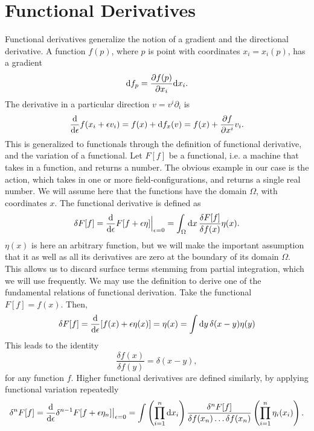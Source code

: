 \section{Functional Derivatives}
\label{section:Functional derivative}
Functional derivatives generalize the notion of a gradient and the directional derivative.
A function $f(p)$, where $p$ is point with coordinates $x_i = x_i(p)$, has a gradient
\begin{equation}
    \dd f_p = \pdv{f(p)}{x_i} \dd x_i.
\end{equation}
The derivative in a particular direction $v = v^i \partial_i$ is 
\begin{equation}
    \dv{\epsilon} f(x_i + \epsilon v_i) = f(x) + \dd f_x (v) = f(x) + \pdv{f}{x^i}v_i.
\end{equation}
This is generalized to functionals through the definition of functional derivative, and the variation of a functional.
Let $F[f]$ be a functional, i.e. a machine that takes in a function, and returns a number.
The obvious example in our case is the action, which takes in one or more field-configurations, and returns a single real number.
We will assume here that the functions have the domain $\Omega$, with coordinates $x$.
The functional derivative is defined as
\begin{equation}
    \delta F[f]
    =
    \dv{\epsilon} F[f + \epsilon \eta] \Big|_{\epsilon = 0}
    = \int_\Omega \dd x \, \frac{\delta F[f]}{\delta f(x)} \eta(x).
\end{equation}
$\eta(x)$ is here an arbitrary function, but we will make the important assumption that it as well as all its derivatives are zero at the boundary of its domain $\Omega$.
This allows us to discard surface terms stemming from partial integration, which we will use frequently.
We may use the definition to derive one of the fundamental relations of functional derivation.
Take the functional $F[f] = f(x)$. 
Then,
\begin{equation}
    \label{Functional derivative delta identity}
    \delta F[f] = \dv{\epsilon} [f(x) + \epsilon \eta(x)] = \eta(x) = \int \dd y \, \delta(x - y) \eta(y)
\end{equation}
This leads to the identity
\begin{equation}
    \frac{\delta f(x)}{\delta f(y)} = \delta(x - y),
\end{equation}
for any function $f$.
Higher functional derivatives are defined similarly, by applying functional variation repeatedly
\begin{equation}
    \delta^n F[f] = \dv{\epsilon} \delta^{n-1}F[f + \epsilon \eta_n] \big|_{\epsilon=0}
    = \int \left(\prod_{i=1}^n \dd x_i\right)
    \frac{\delta^n F[f]}{ \delta f(x_n)\dots\delta f(x_n)} \left(\prod_{i=1}^n \eta_i(x_i)\right).
\end{equation}
